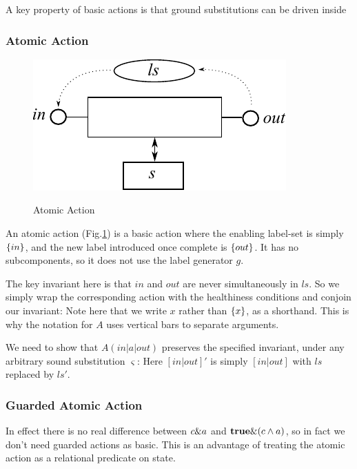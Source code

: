 A key property of basic actions is that ground substitutions
can be driven inside


\newpage
\subsubsection{Atomic Action}

\begin{figure}
  \centering
  \includegraphics{images/atomic-action}\\
  \caption{Atomic Action}
  \label{fig:atomic-action}
\end{figure}

An atomic action (Fig.\ref{fig:atomic-action})
is a basic action where the enabling label-set is
simply $\{in\}$, and the new label introduced once complete
is $\{out\}$.
It has no subcomponents, so it does not use the label generator $g$.

The key invariant here is that $in$ and $out$ are never simultaneously in
$ls$. So we simply wrap the corresponding action with the healthiness
conditions and conjoin our invariant:
 Note here that we write $x$ rather than $\{x\}$, as a shorthand. This
is why the notation for $A$ uses vertical bars to separate arguments.

We need to show that $A(in|a|out)$ preserves the specified
invariant, under any arbitrary sound substitution $\varsigma$:
Here $[in|out]'$ is simply $[in|out]$ with $ls$ replaced by $ls'$.

\subsubsection{Guarded Atomic Action}
In effect there is no real difference between $c \& a$
and $\mathbf{true} \& (c \land a)$,
so in fact we don't need guarded actions as basic.
This is an advantage of treating the atomic action as a relational predicate
on state.

